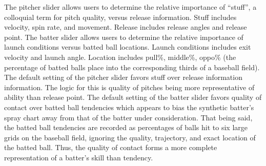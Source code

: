 \documentclass[11pt]{article}
\begin{document}




The pitcher slider allows users to determine the relative importance of ``stuff'', a colloquial term for pitch quality, versus release information. Stuff includes velocity, spin rate, and movement. Release includes release angles and release point. The batter slider allows users to determine the relative importance of launch conditions versus batted ball locations. Launch conditions includes exit velocity and launch angle. Location includes pull\%, middle\%, oppo\% (the percentage of batted balls place into the corresponding thirds of a baseball field). The default setting of the pitcher slider favors stuff over release information information. The logic for this is quality of pitches being more representative of ability than release point. The default setting of the batter slider favors quality of contact over batted ball tendencies which appears to bias the synthetic batter's spray chart away from that of the batter under consideration. That being said, the batted ball tendencies are recorded as percentages of balls hit to six large grids on the baseball field, ignoring the quality, trajectory, and exact location of the batted ball. Thus, the quality of contact forms a more complete representation of a batter's skill than tendency.
\end{document}
